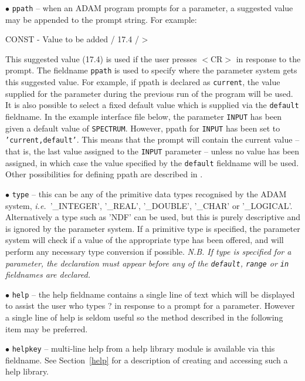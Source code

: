 \documentclass[twoside,11pt,nolof]{starlink}
\begin{document}
\begin{description}
\item{$\bullet$ \tt ppath} --
when an ADAM program prompts for a parameter, a suggested value
may be appended to the prompt string. For example:
\begin{terminalv}
CONST - Value to be added / 17.4 / >
\end{terminalv}
This suggested value (17.4) is used if the user presses
$<$CR$>$ in response to the prompt.
The fieldname \texttt{ppath}
is used to specify where the parameter system gets this suggested value.
For example, if ppath is declared as \texttt{current}, the value supplied for
the parameter during the
previous run of the program will be used.
It is also possible to select a  fixed default value which is supplied
via the \texttt{default}  fieldname.
In the example interface file below, the parameter \texttt{INPUT}
has been given a default value of \texttt{SPECTRUM}.
However, ppath for \texttt{INPUT} has been
set to \texttt{'current,default'}. This means that the prompt will contain the
current value -- that is, the last
value assigned to the \texttt{INPUT} parameter -- unless no value has been assigned, in
which case the value specified by the \texttt{default} fieldname will be used.
Other possibilities for defining ppath are described in
.

\item{$\bullet$ \tt type} -- this can be any of the primitive data types
recognised by the ADAM system, \textit{i.e.}\ '\_INTEGER', '\_REAL', '\_DOUBLE',
'\_CHAR' or '\_LOGICAL'.
Alternatively a type such as 'NDF' can be used, but this is purely
descriptive and is ignored by the parameter system.
If a primitive type is specified, the parameter system
will check if a value of the appropriate type has been offered, and will
perform any necessary type conversion if possible.
{\sl N.B. If type is specified for a parameter, the declaration  must appear
before any of the \texttt{default}, \texttt{range} or  \texttt{in} fieldnames
are declared.}

\item{$\bullet$ \tt help} -- the help fieldname contains a single line
of text which will be displayed to assist the user who types ? in response to a
prompt for a parameter. However a single line of help is seldom useful so
the method described in the following item may be  preferred.

\item{$\bullet$ \tt helpkey} -- multi-line help from a help library
module is available via this
fieldname. See Section~\ref{help} for a description of creating and
accessing such a help
library.



\end{description}
\end{document}
